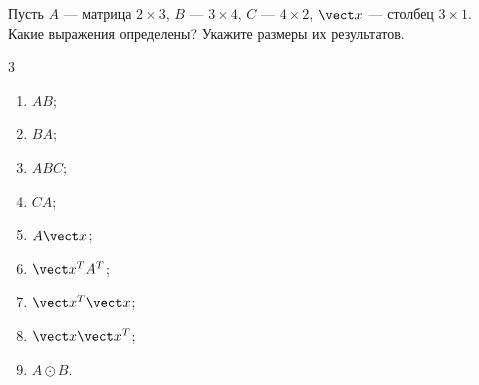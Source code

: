 \begin{exercise}
Пусть $A$ --- матрица $2\times3$, $B$ --- $3\times4$, $C$ --- $4\times2$, $\vect x$ --- столбец $3\times1$. Какие выражения определены? Укажите размеры их результатов.
\begin{multicols}{3}
\begin{enumerate}[label=\asbuk*)]
  \item $AB$;
  \item $BA$;
  \item $ABC$;
  \item $CA$;
  \item $A\vect x$;
  \item $\vect x^TA^T$;
  \item $\vect x^T\vect x$;
  \item $\vect x\vect x^T$;
  \item $A\odot B$.
\end{enumerate}
\end{multicols}
\end{exercise}

\clearpage
